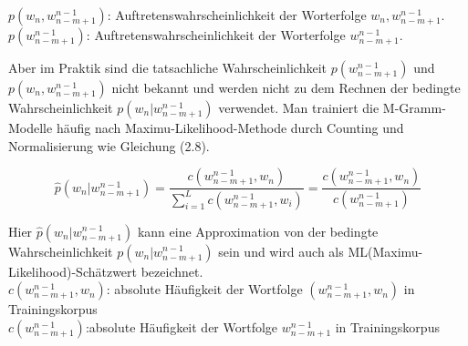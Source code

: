 $p(w_{n},w_{n-m+1}^{n-1})$: Auftretenswahrscheinlichkeit der Worterfolge $w_{n},w_{n-m+1}^{n-1}$.
$p(w_{n-m+1}^{n-1})$: Auftretenswahrscheinlichkeit der Worterfolge $w_{n-m+1}^{n-1}$.


Aber im Praktik sind die tatsachliche Wahrscheinlichkeit $p(w_{n-m+1}^{n-1})$  und $p(w_{n},w_{n-m+1}^{n-1})$ nicht bekannt und werden nicht zu dem Rechnen der bedingte Wahrscheinlichkeit $p(w_{n}|w_{n-m+1}^{n-1})$ verwendet. Man trainiert die M-Gramm-Modelle h\"aufig nach Maximu-Likelihood-Methode \cite{int_MLE} durch Counting und Normalisierung wie Gleichung (2.8). 

\begin{equation}
\hat{p}(w_{n}|w_{n-m+1}^{n-1})=\frac{c(w_{n-m+1}^{n-1},w_{n} )}{ \sum_{i=1}^L c(w_{n-m+1}^{n-1},w_{i})}=\frac{c(w_{n-m+1}^{n-1},w_{n} )}{c(w_{n-m+1}^{n-1})}
\end{equation}

Hier $\hat{p}(w_{n}|w_{n-m+1}^{n-1})$ kann eine Approximation von der bedingte Wahrscheinlichkeit $p(w_{n}|w_{n-m+1}^{n-1})$ sein und wird auch als ML(Maximu-Likelihood)-Sch\"atzwert bezeichnet.\\
$c(w_{n-m+1}^{n-1},w_{n})$: absolute H\"aufigkeit der Wortfolge $(w_{n-m+1}^{n-1},w_{n})$ in Trainingskorpus\\
$c(w_{n-m+1}^{n-1})$:absolute H\"aufigkeit der Wortfolge $w_{n-m+1}^{n-1}$ in Trainingskorpus\\

